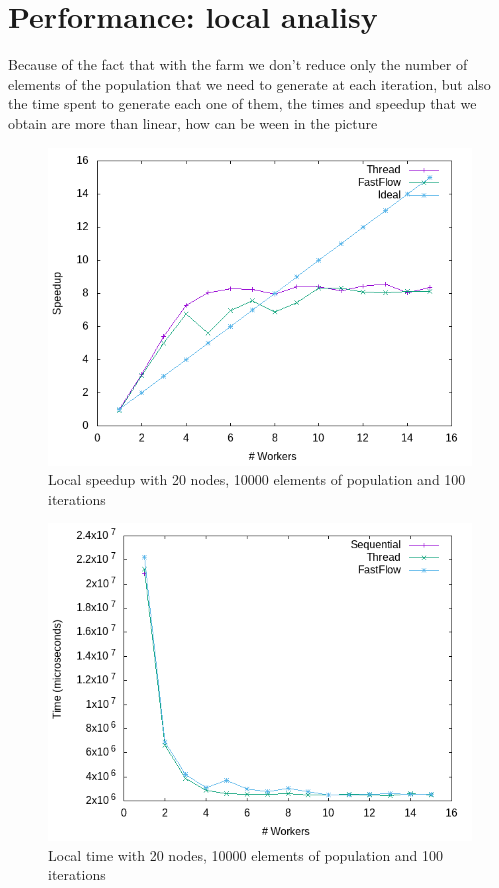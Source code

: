 \documentclass{article}
\begin{document}
    \section{Performance: local analisy}\label{sec:s4}
	Because of the fact that with the farm we don't reduce only the number of elements of the population that we need to generate at each iteration, but also the time spent to generate each one of them, the times and speedup that we obtain are more than linear, how can be ween in the picture
    \begin{figure}
        \includegraphics[width=\linewidth]{img/local_20_10000_100_p.png}
        \caption{Local speedup with 20 nodes, 10000 elements of population and 100 iterations}
        \label{fig:local_speedup}
    \end{figure}
    \begin{figure}
        \includegraphics[width=\linewidth]{img/local_20_10000_100_p_t.png}
        \caption{Local time with 20 nodes, 10000 elements of population and 100 iterations}
        \label{fig:local_time}
    \end{figure}
\end{document}
